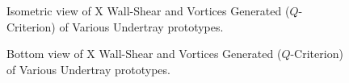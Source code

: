 \begin{figure}[!htbp]
    \centering
    \noindent{}
    \caption{Isometric view of X Wall-Shear and Vortices Generated ($Q$-Criterion) of Various Undertray prototypes.}
    \label{fig:UTP_ISO_QCRIT_ALL_COMPARE}
\end{figure}

\vspace{-1cm}

\begin{figure}[!htbp]
    \centering
    \noindent{}
    \caption{Bottom view of X Wall-Shear and Vortices Generated ($Q$-Criterion) of Various Undertray prototypes.}
    \label{fig:UTP_BOTTOM_QCRIT_ALL_COMPARE}
\end{figure}

